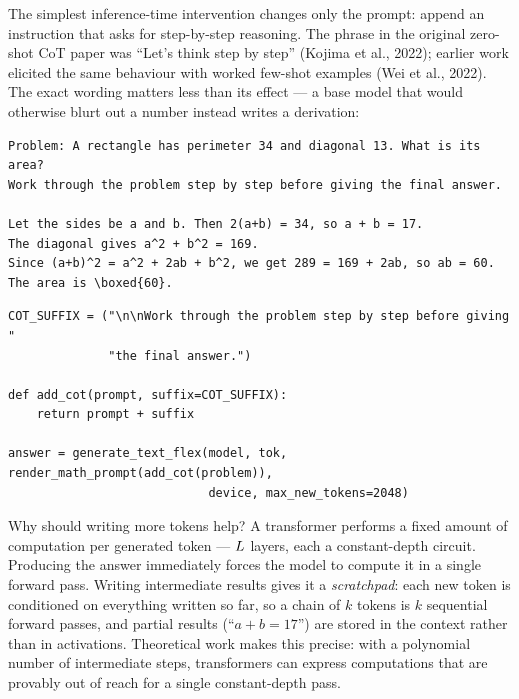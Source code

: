 The simplest inference-time intervention changes only the prompt: append an instruction that asks
for step-by-step reasoning. The phrase in the original zero-shot CoT paper was ``Let's think step
by step'' (Kojima et al., 2022); earlier work elicited the same behaviour with worked few-shot
examples (Wei et al., 2022). The exact wording matters less than its effect --- a base model that
would otherwise blurt out a number instead writes a derivation:

\begin{lstlisting}[style=plain]
Problem: A rectangle has perimeter 34 and diagonal 13. What is its area?
Work through the problem step by step before giving the final answer.

Let the sides be a and b. Then 2(a+b) = 34, so a + b = 17.
The diagonal gives a^2 + b^2 = 169.
Since (a+b)^2 = a^2 + 2ab + b^2, we get 289 = 169 + 2ab, so ab = 60.
The area is \boxed{60}.
\end{lstlisting}

\begin{lstlisting}[caption={Chain-of-thought as a prompt transformation (\texttt{llmsys/tts.py}).},label={lst:scaling:cot}]
COT_SUFFIX = ("\n\nWork through the problem step by step before giving "
              "the final answer.")

def add_cot(prompt, suffix=COT_SUFFIX):
    return prompt + suffix

answer = generate_text_flex(model, tok, render_math_prompt(add_cot(problem)),
                            device, max_new_tokens=2048)
\end{lstlisting}

Why should writing more tokens help? A transformer performs a fixed amount of computation per
generated token --- $L$ layers, each a constant-depth circuit. Producing the answer
immediately forces the model to compute it in a single forward pass. Writing intermediate results
gives it a \emph{scratchpad}: each new token is conditioned on everything written so far, so a
chain of $k$ tokens is $k$ sequential forward passes, and partial results (``$a+b=17$'') are
stored in the context rather than in activations. Theoretical work makes this precise: with a
polynomial number of intermediate steps, transformers can express computations that are provably
out of reach for a single constant-depth pass.


